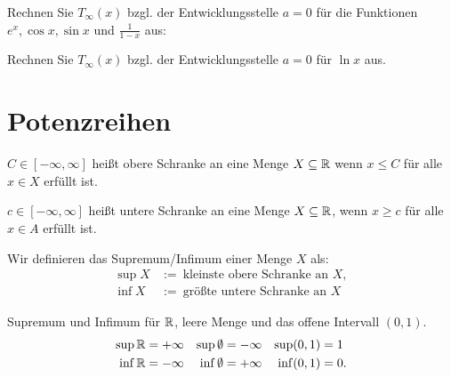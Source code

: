 \begin{aufg}
	Rechnen Sie $T_\infty(x)$ bzgl. der Entwicklungsstelle $a=0$ für die  Funktionen $e^x, \cos x, \sin x$ und $\frac{1}{1-x}$ aus: 
\end{aufg} 

\begin{aufg}
	Rechnen Sie $T_\infty(x)$ bzgl. der Entwicklungsstelle $a=0$ für $\ln x$ aus. 
\end{aufg} 



\section{Potenzreihen} 

\begin{defn} 
	$C \in [-\infty,\infty]$ heißt obere Schranke an eine Menge $X \subseteq \mathbb{R}$ wenn $x \le C$ für alle $x \in X$ erfüllt ist.
	
	$c \in [-\infty,\infty]$ heißt untere Schranke an eine Menge $X \subseteq \mathbb{R}$, wenn $x \ge c$ für alle $x \in A$ erfüllt ist. 
	
	Wir definieren das Supremum/Infimum einer Menge $X$ als:
	\begin{align*}
		\sup X & :=  \ \text{kleinste obere Schranke an $X$},
	\\	\inf X  & := \ \text{größte untere Schranke an $X$}
	\end{align*}
\end{defn} 

\begin{bsp}
	Supremum und Infimum für $\mathbb{R}$, leere Menge und das offene Intervall $(0,1)$. 
	\begin{align*}
		\sup \mathbb{R} & = + \infty  &  \sup \emptyset & = - \infty & \sup (0,1) & = 1
		\\ \inf \mathbb{R} & = -\infty & \inf \emptyset & = +\infty & \inf (0,1)  & = 0. 
	\end{align*}
\end{bsp} 

